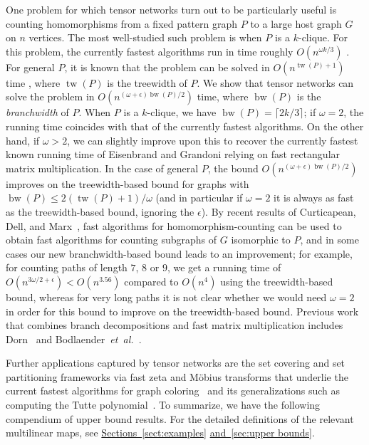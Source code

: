 \documentclass[11pt]{article}
\numberwithin{equation}{section}
\theoremstyle{definition}
\theoremstyle{plain}
\newcommand{\expref}[2]{\hyperref[#2]{#1~\ref{#2}}}
\DeclareMathOperator{\bw}{bw}
\DeclareMathOperator{\tw}{tw}
\begin{document}
One problem for which tensor networks turn out to be particularly useful
is counting homomorphisms from a fixed pattern graph $P$ to
a large host graph $G$ on $n$ vertices.  The most well-studied such problem
is when $P$ is a $k$-clique.  For this problem, the currently fastest
algorithms run in time roughly $O(n^{\omega k/3})$
\cite{Nesetril1985,EisenbrandG2004}.  For general $P$, it is known
that the problem can be solved in $O(n^{\tw(P)+1})$ time
\cite{DiazST02}, where $\tw(P)$ is the treewidth of $P$.
We show that tensor networks can solve the problem in $O(n^{(\omega+\epsilon)
  \bw(P)/2})$ time, where $\bw(P)$ is the \emph{branchwidth} of $P$.
When $P$ is a $k$-clique, we have $\bw(P) = \lceil 2k/3\rceil$; if $\omega = 2$,
the running time coincides with that of the currently fastest algorithms.
On the other hand, if $\omega > 2$, we can slightly improve upon this to recover the
currently fastest known running time of
Eisenbrand and Grandoni \cite{EisenbrandG2004} relying on fast rectangular matrix multiplication.
In the case of general $P$, the bound $O(n^{(\omega+\epsilon) \bw(P)/2})$ improves
on the treewidth-based bound for graphs with $\bw(P) \le
2(\tw(P)+1)/\omega$ (and in particular if $\omega=2$ it is always as
fast as the treewidth-based bound, ignoring the $\epsilon$).  By
recent results of Curticapean, Dell, and Marx~\cite{CurticapeanDM2017},
fast algorithms for homomorphism-counting can be used to obtain fast
algorithms for counting subgraphs of $G$ isomorphic to $P$, and in
some cases our new branchwidth-based bound leads to an improvement;
for example, for counting paths %
of length $7$, $8$ or $9$,
we get a running time of $O(n^{3\omega/2+\epsilon}) < O(n^{3.56})$
compared to $O(n^{4})$ using the treewidth-based bound, whereas for very long
paths it is not clear whether we would need $\omega=2$ in order for
%
this bound %
to improve on the treewidth-based bound. Previous work
that combines branch decompositions and fast matrix
multiplication includes Dorn~\cite{Dorn2006} and
Bodlaender~\emph{et~al.}~\cite{BodlaenderLRV2010}.

Further applications
captured by tensor networks are the set covering and set partitioning
frameworks via fast zeta and M\"obius transforms that underlie the
current fastest algorithms for graph coloring~\cite{BjorklundHK2009}
and its generalizations such as computing the
Tutte polynomial~\cite{BjorklundHKK2007,BjorklundHKK2008}.
To summarize, we have the following compendium
%
of upper bound results.
For the detailed definitions of the relevant multilinear maps,
%
%
see \expref{Sections}{sect:examples} \expref{and}{sec:upper bounds}. %
\end{document}

